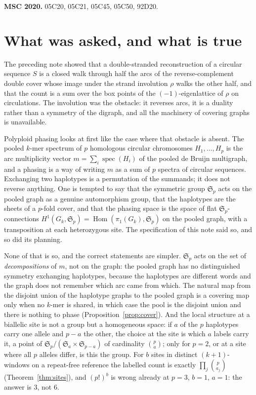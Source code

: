 \documentclass[11pt]{article}
\theoremstyle{plain}
\theoremstyle{definition}
\theoremstyle{remark}
\newcommand{\spec}{\operatorname{spec}}
\newcommand{\Hom}{\operatorname{Hom}}
\newcommand{\Sym}{\mathfrak{S}}
\begin{document}
\noindent\textbf{MSC 2020.} 05C20, 05C21, 05C45, 05C50, 92D20.

\section{What was asked, and what is true}

The preceding note \cite{Bio8} showed that a double-stranded reconstruction of a circular
sequence $S$ is a closed walk through half the arcs of the reverse-complement double cover
whose image under the strand involution $\rho$ walks the other half, and that the count is a
sum over the box points of the $(-1)$-eigenlattice of $\rho$ on circulations. The involution
was the obstacle: it reverses arcs, it is a duality rather than a symmetry of the digraph, and
all the machinery of covering graphs is unavailable.

Polyploid phasing looks at first like the case where that obstacle is absent. The pooled
$k$-mer spectrum of $p$ homologous circular chromosomes $H_1,\dots,H_p$ is the arc
multiplicity vector $m=\sum_i\spec(H_i)$ of the pooled de Bruijn multigraph, and a phasing is
a way of writing $m$ as a sum of $p$ spectra of circular sequences. Exchanging two haplotypes
is a permutation of the summands; it does not reverse anything. One is tempted to say that the
symmetric group $\Sym_p$ acts on the pooled graph as a genuine automorphism group, that the
haplotypes are the sheets of a $p$-fold cover, and that the phasing space is the space of flat
$\Sym_p$-connections $H^1(G_k,\Sym_p)=\Hom(\pi_1(G_k),\Sym_p)$ on the pooled graph, with a
transposition at each heterozygous site. The specification of this note said so, and so did
its planning.

None of that is so, and the correct statements are simpler. $\Sym_p$ acts on the set of
\emph{decompositions} of $m$, not on the graph: the pooled graph has no distinguished symmetry
exchanging haplotypes, because the haplotypes are different words and the graph does not
remember which arc came from which. The natural map from the disjoint union of the haplotype
graphs to the pooled graph is a covering map only when no $k$-mer is shared, in which case
the pool is the disjoint union and there is nothing to phase (Proposition~\ref{prop:cover}).
And the local structure at a biallelic site is not a group but a homogeneous space: if $a$ of
the $p$ haplotypes carry one allele and $p-a$ the other, the choice at the site is which $a$
labels carry it, a point of $\Sym_p/(\Sym_a\times\Sym_{p-a})$ of cardinality $\binom pa$; only
for $p=2$, or at a site where all $p$ alleles differ, is this the group. For $b$ sites in
distinct $(k{+}1)$-windows on a repeat-free reference the labelled count is exactly
$\prod_j\binom{p}{a_j}$ (Theorem~\ref{thm:sites}), and $(p!)^b$ is wrong already at $p=3$,
$b=1$, $a=1$: the answer is $3$, not $6$.
\end{document}
